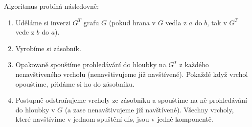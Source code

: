 \documentclass{article}
\begin{document}
Algoritmus probíhá následovně:
\begin{enumerate}
    \item Uděláme si inverzi \(G^T\) grafu \(G\) (pokud hrana v \(G\) vedla z \(a\) do \(b\), tak v \(G^T\) vede z \(b\) do \(a\)).
    \item Vyrobíme si zásobník.
    \item Opakovaně spouštíme prohledávání do hloubky na \(G^T\) z každého nenavštíveného vrcholu (nenavštivujeme již navštívené).
    Pokaždé když vrchol opouštíme, přidáme si ho do zásobníku.
    \item Postupně odstraňujeme vrcholy ze zásobníku a spouštíme na ně prohledávání do hloubky v \(G\) (a zase nenavštivujeme již navštívené).
    Všechny vrcholy, které navštívíme v jednom spuštění dfs, jsou v jedné komponentě.
\end{enumerate}
\end{document}
